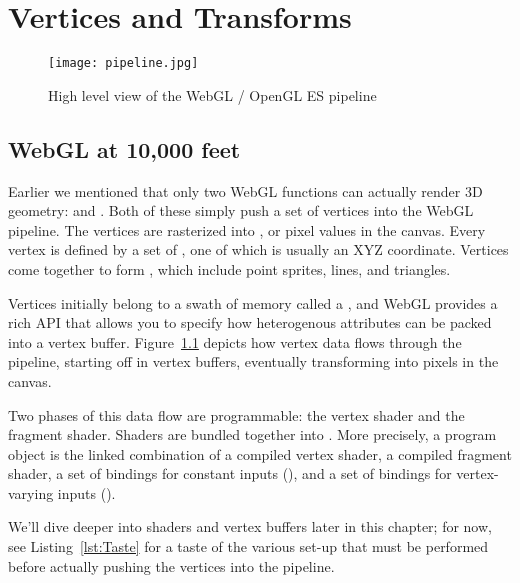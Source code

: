 \chapter{Vertices and Transforms}%
\label{ch2}

\begin{figure}[htb]\centering
  \texttt{[image: pipeline.jpg]}
  \caption{High level view of the WebGL / OpenGL ES pipeline}
  \label{fig:AssemblyLine}
\end{figure}

\section{WebGL at 10,000 feet}

Earlier we mentioned that only two WebGL functions can actually render 3D geometry:  and .  Both of these simply push a set of  vertices into the WebGL pipeline.  The vertices are rasterized into  , or pixel values in the canvas.  Every vertex is defined by a set of , one of which is usually an XYZ coordinate.  Vertices come together to form , which include point sprites, lines, and triangles.

Vertices initially belong to a swath of memory called a , and WebGL provides a rich API that allows you to specify how heterogenous attributes can be packed into a vertex buffer.  Figure~\ref{fig:AssemblyLine} depicts how vertex data flows through the pipeline, starting off in vertex buffers, eventually transforming into pixels in the canvas.

Two phases of this data flow are programmable: the vertex shader and the fragment shader.  Shaders are bundled together into  .   More precisely, a program object is the linked combination of a compiled vertex shader, a compiled fragment shader, a set of bindings for constant inputs (), and a set of bindings for vertex-varying inputs ().

We'll dive deeper into shaders and vertex buffers later in this chapter; for now, see Listing~\ref{lst:Taste} for a taste of the various set-up that must be performed before actually pushing the vertices into the pipeline.

